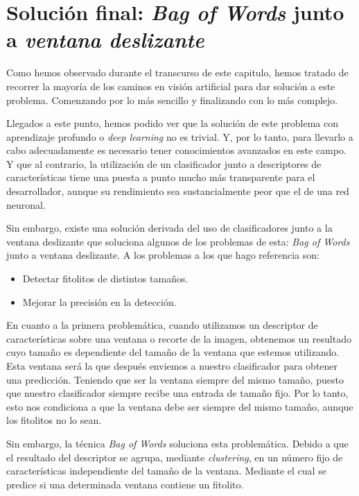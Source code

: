 \section{Solución final: \textit{Bag of Words} junto  a \textit{ventana deslizante}}

Como hemos observado durante el transcurso de este capitulo, hemos tratado de recorrer la mayoría de los caminos en visión artificial para dar solución a este problema. Comenzando por lo más sencillo y finalizando con lo más complejo.

Llegados a este punto, hemos podido ver que la solución de este problema con aprendizaje profundo o \textit{deep learning} no es trivial. Y, por lo tanto, para llevarlo a cabo adecuadamente es necesario tener conocimientos avanzados en este campo. Y que al contrario, la utilización de un clasificador junto a descriptores de características tiene una puesta a punto mucho más transparente para el desarrollador, aunque su rendimiento sea sustancialmente peor que el de una red neuronal.

Sin embargo, existe una solución derivada del uso de clasificadores junto a la ventana deslizante que soluciona algunos de los problemas de esta: \textit{Bag of Words} junto a ventana deslizante. A los problemas a los que hago referencia son:

\begin{itemize}
	\item Detectar fitolitos de distintos tamaños.
	\item Mejorar la precisión en la detección.
\end{itemize}

En cuanto a la primera problemática, cuando utilizamos un descriptor de características sobre una ventana o recorte de la imagen, obtenemos un resultado cuyo tamaño es dependiente del tamaño de la ventana que estemos utilizando. Esta ventana será la que después enviemos a nuestro clasificador para obtener una predicción. Teniendo que ser la ventana siempre del mismo tamaño, puesto que nuestro clasificador siempre recibe una entrada de tamaño fijo. Por lo tanto, esto nos condiciona a que la ventana debe ser siempre del mismo tamaño, aunque los fitolitos no lo sean.

Sin embargo, la técnica \textit{Bag of Words} soluciona esta problemática. Debido a que el resultado del descriptor se agrupa, mediante \textit{clustering}, en un número fijo de características independiente del tamaño de la ventana. Mediante el cual se predice si una determinada ventana contiene un fitolito.

